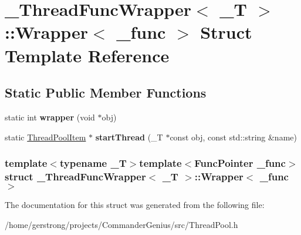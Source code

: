 \hypertarget{struct___thread_func_wrapper_1_1_wrapper}{
\section{\_\-ThreadFuncWrapper$<$ \_\-T $>$::Wrapper$<$ \_\-func $>$ Struct Template Reference}
\label{struct___thread_func_wrapper_1_1_wrapper}
}
\subsection*{Static Public Member Functions}
\begin{DoxyCompactItemize}
\item 
\hypertarget{struct___thread_func_wrapper_1_1_wrapper_a36c33144f6015095e4e55baac4314b12}{
static int {\bfseries wrapper} (void $\ast$obj)}
\label{struct___thread_func_wrapper_1_1_wrapper_a36c33144f6015095e4e55baac4314b12}

\item 
\hypertarget{struct___thread_func_wrapper_1_1_wrapper_a9118c4044ba26c6eb0982bbae6e0993d}{
static \hyperlink{struct_thread_pool_item}{ThreadPoolItem} $\ast$ {\bfseries startThread} (\_\-T $\ast$const obj, const std::string \&name)}
\label{struct___thread_func_wrapper_1_1_wrapper_a9118c4044ba26c6eb0982bbae6e0993d}

\end{DoxyCompactItemize}
\subsubsection*{template$<$typename \_\-T$>$template$<$FuncPointer \_\-func$>$ struct \_\-ThreadFuncWrapper$<$ \_\-T $>$::Wrapper$<$ \_\-func $>$}



The documentation for this struct was generated from the following file:\begin{DoxyCompactItemize}
\item 
/home/gerstrong/projects/CommanderGenius/src/ThreadPool.h\end{DoxyCompactItemize}
